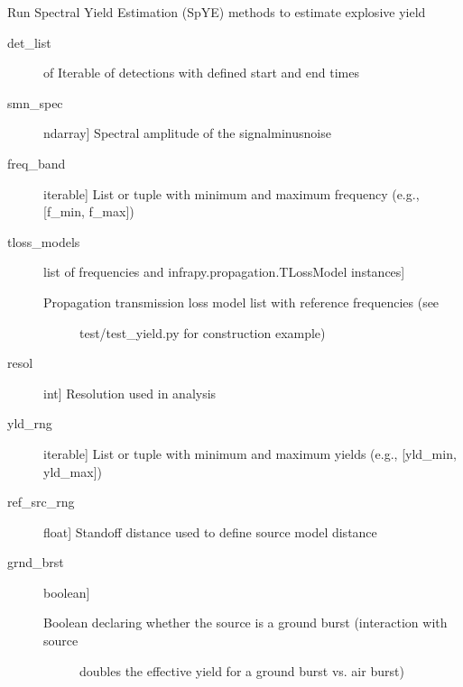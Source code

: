 \documentclass[letterpaper,10pt,english]{sphinxmanual}
\begin{document}
\begin{fulllineitems}
\label{\detokenize{infrapy.characterization:infrapy.characterization.spye.run}}
Run Spectral Yield Estimation (SpYE) methods to estimate explosive yield
\begin{description}
\item[{det\_list}] \leavevmode{[} of \sphinxcode{\sphinxupquote{InfrasoundDetection}}{]}
Iterable of detections with defined start and end times

\item[{smn\_spec}] \leavevmode{[}ndarray{]}
Spectral amplitude of the signal\sphinxhyphen{}minus\sphinxhyphen{}noise

\item[{freq\_band}] \leavevmode{[}iterable{]}
List or tuple with minimum and maximum frequency (e.g.,  {[}f\_min, f\_max{]})

\item[{tloss\_models}] \leavevmode{[}list of frequencies and infrapy.propagation.TLossModel instances{]}\begin{description}
\item[{Propagation transmission loss model list with reference frequencies (see}] \leavevmode
test/test\_yield.py for construction example)

\end{description}

\item[{resol}] \leavevmode{[}int{]}
Resolution used in analysis

\item[{yld\_rng}] \leavevmode{[}iterable{]}
List or tuple with minimum and maximum yields (e.g., {[}yld\_min, yld\_max{]})

\item[{ref\_src\_rng}] \leavevmode{[}float{]}
Standoff distance used to define source model distance

\item[{grnd\_brst}] \leavevmode{[}boolean{]}\begin{description}
\item[{Boolean declaring whether the source is a ground burst (interaction with source}] \leavevmode
doubles the effective yield for a ground burst vs. air burst)


\end{description}
\end{description}
\end{fulllineitems}
\end{document}
